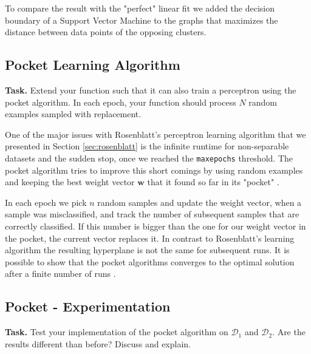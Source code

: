 \documentclass{support/acm_proc_article-sp}
\begin{document}
    To compare the result with the "perfect" linear fit we added the decision boundary of a Support Vector Machine
    to the graphs that maximizes the distance between data points of the opposing clusters.


    \subsection{Pocket Learning Algorithm}

    \textbf{Task.} Extend your function such that it can also train a perceptron using the pocket algorithm.
    In each epoch, your function should process $N$ random examples sampled with replacement.

    One of the major issues with Rosenblatt's perceptron learning algorithm that we presented in Section \ref{sec:rosenblatt}
    is the infinite runtime for non-separable datasets and the sudden stop, once we reached the \lstinline{maxepochs} threshold.
    The pocket algorithm tries to improve this short comings by using random examples and keeping the best
    weight vector $\mathbf{w}$ that it found so far in its "pocket" \cite[p.91f.]{Rojas:1996:NNS:235222}.

    In each epoch we pick $n$ random samples and update the weight vector, when a sample was misclassified, and track the number
    of subsequent samples that are correctly classified.
    If this number is bigger than the one for our weight vector in the pocket, the current vector replaces it.
    In contrast to Rosenblatt's learning algorithm the resulting hyperplane is not the same for subsequent runs.
    It is possible to show that the pocket algorithms converges to the optimal solution after a finite number
    of runs \cite{Gallant:80230}.


    \subsection{Pocket - Experimentation}

    \textbf{Task.} Test your implementation of the pocket algorithm on $\mathcal{D}_1$ and $\mathcal{D}_2$.
    Are the results different than before?
    Discuss and explain.
\end{document}
